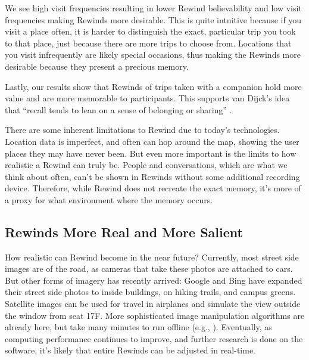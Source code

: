 \documentclass{sigchi}
\begin{document}
We see high visit frequencies resulting in lower Rewind believability and low visit frequencies making Rewinds more desirable. This is quite intuitive because if you visit a place often, it is harder to distinguish the exact, particular trip you took to that place, just because there are more trips to choose from. Locations that you visit infrequently are likely special occasions, thus making the Rewinds more desirable because they present a precious memory.

Lastly, our results show that Rewinds of trips taken with a companion hold more value and are more memorable to participants. This supports van Dijck's idea that ``recall tends to lean on a sense of belonging or sharing'' \cite{van2007mediated}.

		

There are some inherent limitations to Rewind due to today's technologies. Location data is imperfect, and often can hop around the map, showing the user places they may have never been. But even more important is the limits to how realistic a Rewind can truly be. People and conversations, which are what we think about often, can't be shown in Rewinds without some additional recording device. Therefore, while Rewind does not recreate the exact memory, it's more of a proxy for what environment where the memory occurs.

\subsection{Rewinds More Real and More Salient}

How realistic can Rewind become in the near future? Currently, most street side images are of the road, as cameras that take these photos are attached to cars. But other forms of imagery has recently arrived: Google and Bing have expanded their street side photos to inside buildings, on hiking trails, and campus greens. Satellite images can be used for travel in airplanes and simulate the view outside the window from seat 17F. More sophisticated image manipulation algorithms are already here, but take many minutes to run offline (e.g., \cite{laffont2014transient,shih2013data}). Eventually, as computing performance continues to improve, and further research is done on the software, it's likely that entire Rewinds can be adjusted in real-time.
\end{document}
